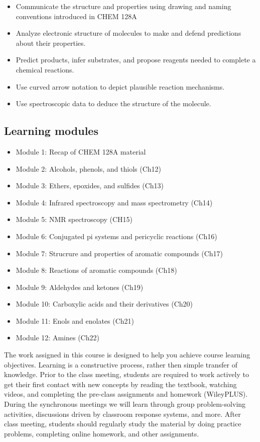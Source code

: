 \begin{itemize}
\tightlist
\item
  Communicate the structure and properties using drawing and naming
  conventions introduced in CHEM 128A
\item
  Analyze electronic structure of molecules to make and defend
  predictions about their properties.
\item
  Predict products, infer substrates, and propose reagents needed to
  complete a chemical reactions.
\item
  Use curved arrow notation to depict plausible reaction mechanisms.
\item
  Use spectroscopic data to deduce the structure of the molecule.
\end{itemize}

\hypertarget{learning-modules}{%
\subsection{Learning modules}\label{learning-modules}}

\begin{itemize}
\tightlist
\item
  Module 1: Recap of CHEM 128A material
\item
  Module 2: Alcohols, phenols, and thiols (Ch12)
\item
  Module 3: Ethers, epoxides, and sulfides (Ch13)
\item
  Module 4: Infrared spectroscopy and mass spectrometry (Ch14)
\item
  Module 5: NMR spectroscopy (CH15)
\item
  Module 6: Conjugated pi systems and pericyclic reactions (Ch16)
\item
  Module 7: Strucrure and properties of aromatic compounds (Ch17)
\item
  Module 8: Reactions of aromatic compounds (Ch18)
\item
  Module 9: Aldehydes and ketones (Ch19)
\item
  Module 10: Carboxylic acids and their derivatives (Ch20)
\item
  Module 11: Enols and enolates (Ch21)
\item
  Module 12: Amines (Ch22)
\end{itemize}

The work assigned in this course is designed to help you achieve course
learning objectives. Learning is a constructive process, rather then
simple transfer of knowledge. Prior to the class meeting, students are
required to work actively to get their first contact with new concepts
by reading the textbook, watching videos, and completing the pre-class
assignments and homework (WileyPLUS). During the synchronous meetings we
will learn through group problem-solving activities, discussions driven
by classroom response systems, and more. After class meeting, students
should regularly study the material by doing practice problems,
completing online homework, and other assignments.

